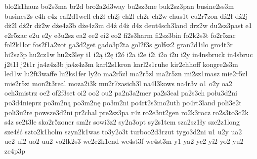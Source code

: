 {blo2k1hauz
bo2s3ma
br2d
bro2a2d3way
bu2sz3me
buk2sz3pan
busine2ss3m
busines2s
c4h
c4z
cal2d1well
ch2ł
ch2j
ch2l
ch2r
ch2w
chus1t
cu2r7zon
dż2ł
dż2j
dż2l
dż2r
dż2w
dże4z3b
dże4z3m
d4ź
d4ż
d4z
deut4sch3land
drz2w
du2sz3past
e1
e2r5zac
e2u
e2y
e3u2sz
ea2
ee2
ei2
eo2
fi2s3harm
fi2sz3bin
fo2k2s3t
fo2r5zac
fol2k1lor
fos2f1a2zot
ga3d2get
gado3p2ta
gol2f3s
golfsz2
gran2d1ilo
gro4t3r
hi2sz3p
hu2cz1w
hu2x3ley
i1
i2ą
i2ę
i2ó
i2a
i2e
i2i
i2o
i2u
i2y
in4nsbruck
in4sbruc
j2t1ł
j2t1r
ja4z4z3b
ja4z4z3m
karl2s1kron
karl2s1ruhe
kir2chhoff
kongre2s3m
led1w
lu2ft3waffe
lu2ks1fer
ly2o
ma2r5zł
ma2r5zl
ma2r5zn
mi2sz1masz
mie2r5zł
mie2r5zi
mon2t3real
moza2i3k
mu2r7zasich3l
na4ł3kows
na4r3v
o1
o2y
oa2
och3mistrz
oe2
of2f3set
oi2
oo2
ou2
pa2n3a2mer
pa2s3cal
pa2s3ch
połu3d2ni
po3d4nieprz
po3m2ną
po3m2nę
po3m2ni
po4rt2s3mo2uth
po4rt3land
poli3e2t
poli3u2re
powsze3d2ni
pr2chal
pre2sz3pa
r4z
ro2e3nt2gen
ro2k3rocz
ro2s3to3c2k
s4z
se2t3le
sko2r5zoner
sm2r
sowi3z2
sy2n3opt
sy2s1tem
sza2sz1ły
sze2z1long
sze4ść
szto2k1holm
szyn2k1was
to3y2o3t
turboo2d3rzut
tygo3d2ni
u1
u2y
ua2
ue2
ui2
uo2
uu2
vo2lk2s3
we2e2k1end
we4st3f
we4st3m
y1
ya2
ye2
yi2
yo2
yu2
ze4p3p
}
